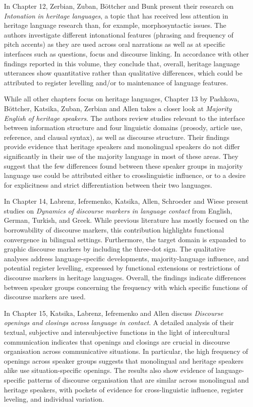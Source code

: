 \documentclass[output=paper,colorlinks,citecolor=brown]{langscibook}
\begin{document}
In Chapter 12, Zerbian, Zuban, Böttcher and Bunk present their research on \textit{Intonation in heritage languages}, a topic that has received less attention in heritage language research than, for example, morphosyntactic issues. The authors investigate different intonational features (phrasing and frequency of pitch accents) as they are used across oral narrations as well as at specific interfaces such as questions, focus and discourse linking. In accordance with other findings reported in this volume, they conclude that, overall, heritage language utterances show quantitative rather than qualitative differences, which could be attributed to register levelling and/or to maintenance of language features.

While all other chapters focus on heritage languages, Chapter 13 by Pashkova, Böttcher, Katsika, Zuban, Zerbian and Allen takes a closer look at \textit{Majority English of heritage speakers}. The authors review studies relevant to the interface between information structure and four linguistic domains (prosody, article use, reference, and clausal syntax), as well as discourse structure. Their findings provide evidence that heritage speakers and monolingual speakers do not differ significantly in their use of the majority language in most of these areas. They suggest that the few differences found between these speaker groups in majority language use could be attributed either to crosslinguistic influence, or to a desire for explicitness and strict differentiation between their two languages.

In Chapter 14, Labrenz, Iefremenko, Katsika, Allen, Schroeder and Wiese present studies on \textit{Dynamics of discourse markers in language contact} from English, German, Turkish, and Greek. While previous literature has mostly focused on the borrowability of discourse markers, this contribution highlights functional convergence in bilingual settings. Furthermore, the target domain is expanded to graphic discourse markers by including the three-dot sign. The qualitative analyses address language-specific developments, majority-language influence, and potential register levelling, expressed by functional extensions or restrictions of discourse markers in heritage languages. Overall, the findings indicate differences between speaker groups concerning the frequency with which specific functions of discourse markers are used. 

In Chapter 15, Katsika, Labrenz, Iefremenko and Allen discuss \textit{Discourse openings and closings across language in contact}. A detailed analysis of their textual, subjective and intersubjective functions in the light of intercultural communication indicates that openings and closings are crucial in discourse organisation across communicative situations. In particular, the high frequency of openings across speaker groups suggests that monolingual and heritage speakers alike use situation-specific openings. The results also show evidence of language-specific patterns of discourse organisation that are similar across monolingual and heritage speakers, with pockets of evidence for cross-linguistic influence, register leveling, and individual variation.
\end{document}
